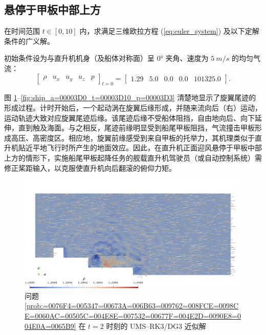 \subsection{悬停于甲板中部上方}
\begin{problem}
[直升机正面迎风悬停于甲板中部上方]\label{prob:=0076F4=005347=00673A=006B63=009762=008FCE=0098CE=0060AC=00505C=004E8E=007532=00677F=004E2D=0090E8=004E0A=0065B9}在时间范围
$t\in[0,10]$ 内，求满足三维欧拉方程 (\ref{eq:euler_system}) 及以下定解条件的广义解。

初始条件设为与直升机机身（及船体对称面）呈 $\ang{0}$ 夹角、速度为 $\SI{5}{m/s}$ 的均匀气流：
\begin{equation}
\begin{bmatrix}\rho & u_{x} & u_{y} & u_{z} & p\end{bmatrix}_{t=0}=\begin{bmatrix}1.29 & 5.0 & 0.0 & 0.0 & 101325.0\end{bmatrix}.
\end{equation}
\end{problem}

图 \ref{fig:ship_a=00003D0_t=00003D2_p=00003D3}–\ref{fig:ship_a=00003D0_t=00003D10_p=00003D3}
清楚地显示了旋翼尾迹的形成过程。计时开始后，一个起动涡在旋翼后缘形成，并随来流向后（右）运动，运动轨迹大致对应旋翼尾迹后缘。该尾迹后缘不受船体阻挡，自由地向后、向下延伸，直到触及海面。与之相反，尾迹前缘明显受到船尾甲板阻挡，气流撞击甲板形成高压、高密度区。相应地，旋翼前缘感受到来自甲板的托举力，其机理类似于直升机贴近平地飞行时所产生的地面效应。因此，在直升机正面迎风悬停于甲板中部上方的情形下，实施船尾甲板起降任务的舰载直升机驾驶员（或自动控制系统）需修正桨距输入，以克服使直升机向后翻滚的俯仰力矩。

\begin{figure}[h!]
\begin{centering}
\includegraphics[width=1\textwidth,height=0.4\textheight,keepaspectratio]{figures/ship/a=0_p=3/Frame20}
\par\end{centering}
\caption{\label{fig:ship_a=00003D0_t=00003D2_p=00003D3}问题 \ref{prob:=0076F4=005347=00673A=006B63=009762=008FCE=0098CE=0060AC=00505C=004E8E=007532=00677F=004E2D=0090E8=004E0A=0065B9}
在 $t=2$ 时刻的 UMS–RK3/DG3 近似解}
\end{figure}

